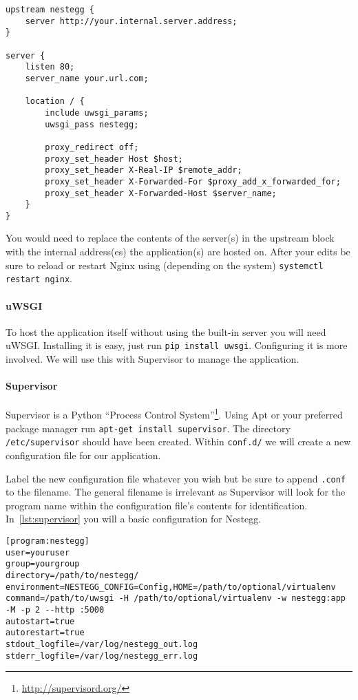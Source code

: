 \documentclass[11pt]{article}
\newcommand{\cmd}[1]{\textcolor{code}{\texttt{#1}}}
\begin{document}
					\begin{lstlisting}[numbers=none,tabsize=2,caption=Nginx Example,label={lst:nginxconf}]
upstream nestegg {
	server http://your.internal.server.address;
}

server {
	listen 80;
	server_name your.url.com;
	
	location / {
		include uwsgi_params;
		uwsgi_pass nestegg;
		
		proxy_redirect off;
		proxy_set_header Host $host;
		proxy_set_header X-Real-IP $remote_addr;
		proxy_set_header X-Forwarded-For $proxy_add_x_forwarded_for;
		proxy_set_header X-Forwarded-Host $server_name;
	}
}
					\end{lstlisting}
					
					You would need to replace the contents of the server(s) in the upstream block with the internal address(es) the application(s) are hosted on. After your edits be sure to reload or restart Nginx using (depending on the system) \cmd{systemctl restart nginx}.
					
				\paragraph{uWSGI} To host the application itself without using the built-in server you will need uWSGI. Installing it is easy, just run \cmd{pip install uwsgi}. Configuring it is more involved. We will use this with Supervisor to manage the application.
				
				\paragraph{Supervisor} Supervisor is a Python ``Process Control System''\footnote{\url{http://supervisord.org/}}. Using Apt or your preferred package manager run \cmd{apt-get install supervisor}. The directory \cmd{/etc/supervisor} should have been created. Within \cmd{conf.d/} we will create a new configuration file for our application.
				
				Label the new configuration file whatever you wish but be sure to append \cmd{.conf} to the filename. The general filename is irrelevant as Supervisor will look for the program name within the configuration file's contents for identification. In~\cref{lst:supervisor} you will a basic configuration for Nestegg.
				
				\begin{lstlisting}[numbers=none,breaklines=true,caption=nestegg.conf,label={lst:supervisor}]
[program:nestegg]
user=youruser
group=yourgroup
directory=/path/to/nestegg/
environment=NESTEGG_CONFIG=Config,HOME=/path/to/optional/virtualenv
command=/path/to/uwsgi -H /path/to/optional/virtualenv -w nestegg:app -M -p 2 --http :5000
autostart=true
autorestart=true
stdout_logfile=/var/log/nestegg_out.log
stderr_logfile=/var/log/nestegg_err.log
				\end{lstlisting}
				
\end{document}

